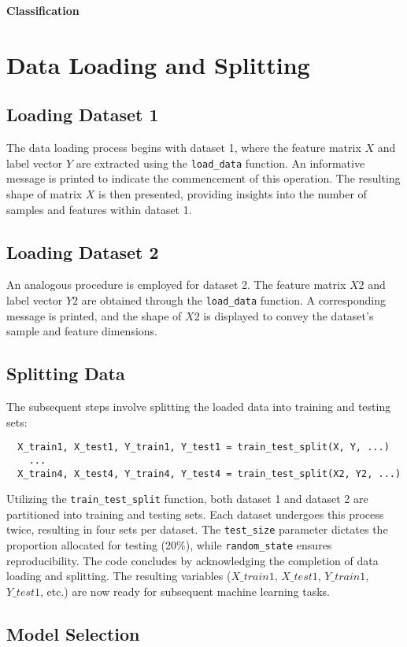 \documentclass{article}
\begin{document}
\begin{titlepage}
  \begin{center}
    {\Huge\bfseries Classification\par}
  \end{center}
  \vspace{2cm}

  \section{Data Loading and Splitting}

  \subsection{Loading Dataset 1}
  The data loading process begins with dataset 1, where the feature matrix \(X\) and label vector \(Y\) are extracted using the \texttt{load\_data} function. An informative message is printed to indicate the commencement of this operation. The resulting shape of matrix \(X\) is then presented, providing insights into the number of samples and features within dataset 1.
  
  \subsection{Loading Dataset 2}
  An analogous procedure is employed for dataset 2. The feature matrix \(X2\) and label vector \(Y2\) are obtained through the \texttt{load\_data} function. A corresponding message is printed, and the shape of \(X2\) is displayed to convey the dataset's sample and feature dimensions.  
    
  \subsection{Splitting Data}
  The subsequent steps involve splitting the loaded data into training and testing sets:
  
  \begin{verbatim}
  X_train1, X_test1, Y_train1, Y_test1 = train_test_split(X, Y, ...)
    ...
  X_train4, X_test4, Y_train4, Y_test4 = train_test_split(X2, Y2, ...)
  \end{verbatim}
  
  Utilizing the \texttt{train\_test\_split} function, both dataset 1 and dataset 2 are partitioned into training and testing sets. Each dataset undergoes this process twice, resulting in four sets per dataset. 
  The \texttt{test\_size} parameter dictates the proportion allocated for testing (20\%), while \texttt{random\_state} ensures reproducibility.
  \newline
  \newline
  The code concludes by acknowledging the completion of data loading and splitting.
  \newline
  \newline
  The resulting variables (\(X\_train1\), \(X\_test1\), \(Y\_train1\), \(Y\_test1\), etc.) are now ready for subsequent machine learning tasks.    

\end{titlepage} 

\begin{titlepage}
  \section*{Model Selection}
  
\end{titlepage}
\end{document}
